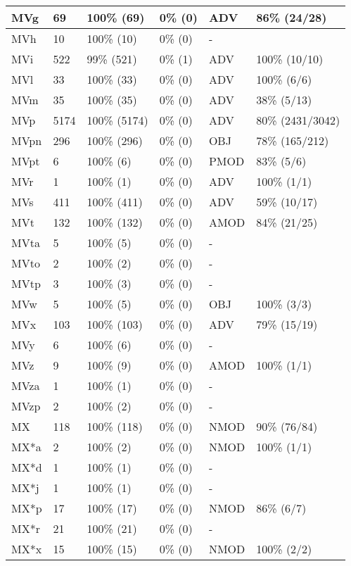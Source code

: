 \begin{figure*}
\begin{tabular}{|l|l|l|l||l|l|}
\hline
 MVg & 69 & 100\% (69) & 0\% (0) & ADV & 86\% (24/28) \\ 
\hline
 MVh & 10 & 100\% (10) & 0\% (0) & - &  \\ 
\hline
 MVi & 522 & 99\% (521) & 0\% (1) & ADV & 100\% (10/10) \\ 
\hline
 MVl & 33 & 100\% (33) & 0\% (0) & ADV & 100\% (6/6) \\ 
\hline
 MVm & 35 & 100\% (35) & 0\% (0) & ADV & 38\% (5/13) \\ 
\hline
 MVp & 5174 & 100\% (5174) & 0\% (0) & ADV & 80\% (2431/3042) \\ 
\hline
 MVpn & 296 & 100\% (296) & 0\% (0) & OBJ & 78\% (165/212) \\ 
\hline
 MVpt & 6 & 100\% (6) & 0\% (0) & PMOD & 83\% (5/6) \\ 
\hline
 MVr & 1 & 100\% (1) & 0\% (0) & ADV & 100\% (1/1) \\ 
\hline
 MVs & 411 & 100\% (411) & 0\% (0) & ADV & 59\% (10/17) \\ 
\hline
 MVt & 132 & 100\% (132) & 0\% (0) & AMOD & 84\% (21/25) \\ 
\hline
 MVta & 5 & 100\% (5) & 0\% (0) & - &  \\ 
\hline
 MVto & 2 & 100\% (2) & 0\% (0) & - &  \\ 
\hline
 MVtp & 3 & 100\% (3) & 0\% (0) & - &  \\ 
\hline
 MVw & 5 & 100\% (5) & 0\% (0) & OBJ & 100\% (3/3) \\ 
\hline
 MVx & 103 & 100\% (103) & 0\% (0) & ADV & 79\% (15/19) \\ 
\hline
 MVy & 6 & 100\% (6) & 0\% (0) & - &  \\ 
\hline
 MVz & 9 & 100\% (9) & 0\% (0) & AMOD & 100\% (1/1) \\ 
\hline
 MVza & 1 & 100\% (1) & 0\% (0) & - &  \\ 
\hline
 MVzp & 2 & 100\% (2) & 0\% (0) & - &  \\ 
\hline
 MX & 118 & 100\% (118) & 0\% (0) & NMOD & 90\% (76/84) \\ 
\hline
 MX*a & 2 & 100\% (2) & 0\% (0) & NMOD & 100\% (1/1) \\ 
\hline
 MX*d & 1 & 100\% (1) & 0\% (0) & - &  \\ 
\hline
 MX*j & 1 & 100\% (1) & 0\% (0) & - &  \\ 
\hline
 MX*p & 17 & 100\% (17) & 0\% (0) & NMOD & 86\% (6/7) \\ 
\hline
 MX*r & 21 & 100\% (21) & 0\% (0) & - &  \\ 
\hline
 MX*x & 15 & 100\% (15) & 0\% (0) & NMOD & 100\% (2/2) \\ 
\hline
\end{tabular}
\end{figure*}
